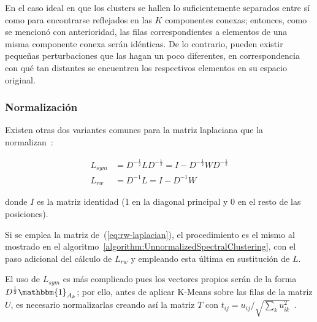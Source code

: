 En el caso ideal en que los clusters se hallen lo suficientemente separados entre sí como para encontrarse reflejados en las $K$ componentes conexas;
entonces, como se mencionó con anterioridad, las filas correspondientes a elementos de una misma componente conexa serán idénticas.
De lo contrario, pueden existir pequeñas perturbaciones que las hagan un poco diferentes, en correspondencia con qué tan distantes se encuentren los respectivos elementos en su espacio original.

\subsubsection{Normalización}

Existen otras dos variantes comunes para la matriz laplaciana que la normalizan~\cite{Aggarawal13}:

\begin{align}
    \label{eq:sym-laplacian}
    L_{sym} & = D^{-\frac{1}{2}}LD^{-\frac{1}{2}} = I - D^{-\frac{1}{2}} W D^{-\frac{1}{2}} \\
    \label{eq:rw-laplacian}
    L_{rw} & = D^{-1}L = I - D^{-1}W
\end{align}

\noindent donde $I$ es la matriz identidad (1 en la diagonal principal y 0 en el resto de las posiciones).

Si se emplea la matriz de~(\ref{eq:rw-laplacian}), el procedimiento es el mismo al mostrado en el algoritmo~\ref{algorithm:UnnormalizedSpectralClustering}, con el paso adicional del cálculo de $L_{rw}$ y empleando esta última en sustitución de $L$.

El uso de $L_{sym}$ es más complicado pues los vectores propios serán de la forma $D^{\frac{1}{2}}\mathbbm{1}_{A_k}$; por ello, antes de aplicar K-Means sobre las filas de la matriz $U$, es necesario normalizarlas creando así la matriz $T$ con $t_{ij} = u_{ij}/\sqrt{\sum_{k}{u_{ik}^2}}$~\cite{Murphy12}.
